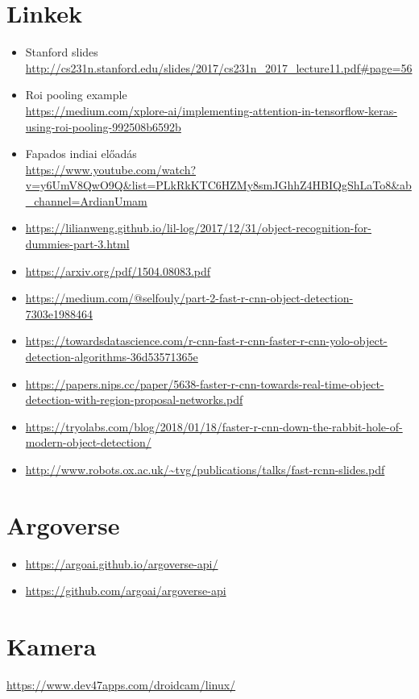 \documentclass[12pt]{report}
\begin{document}
\chapter{Linkek}
\begin{itemize}
\item Stanford slides \\\url{http://cs231n.stanford.edu/slides/2017/cs231n_2017_lecture11.pdf#page=56}
\item Roi pooling example \\\url{https://medium.com/xplore-ai/implementing-attention-in-tensorflow-keras-using-roi-pooling-992508b6592b}
\item Fapados indiai előadás \\\url{https://www.youtube.com/watch?v=y6UmV8QwO9Q&list=PLkRkKTC6HZMy8smJGhhZ4HBIQgShLaTo8&ab_channel=ArdianUmam}
\item \url{https://lilianweng.github.io/lil-log/2017/12/31/object-recognition-for-dummies-part-3.html}
\item \url{https://arxiv.org/pdf/1504.08083.pdf}
\item \url{https://medium.com/@selfouly/part-2-fast-r-cnn-object-detection-7303e1988464}
\item \url{https://towardsdatascience.com/r-cnn-fast-r-cnn-faster-r-cnn-yolo-object-detection-algorithms-36d53571365e}
\item \url{https://papers.nips.cc/paper/5638-faster-r-cnn-towards-real-time-object-detection-with-region-proposal-networks.pdf}
\item \url{https://tryolabs.com/blog/2018/01/18/faster-r-cnn-down-the-rabbit-hole-of-modern-object-detection/}
\item \url{http://www.robots.ox.ac.uk/~tvg/publications/talks/fast-rcnn-slides.pdf}
\end{itemize}

\chapter{Argoverse}
\begin{itemize}
	\item \url{https://argoai.github.io/argoverse-api/}
	\item \url{https://github.com/argoai/argoverse-api}
\end{itemize}


\chapter{Kamera}
\url{https://www.dev47apps.com/droidcam/linux/}
\end{document}
